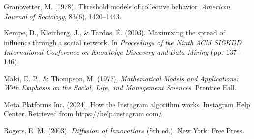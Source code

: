 \documentclass[11pt]{article}
\begin{document}
Granovetter, M. (1978). Threshold models of collective behavior. \textit{American Journal of Sociology}, 83(6), 1420--1443.

Kempe, D., Kleinberg, J., \& Tardos, \'{E}. (2003). Maximizing the spread of influence through a social network. In \textit{Proceedings of the Ninth ACM SIGKDD International Conference on Knowledge Discovery and Data Mining} (pp.~137--146).

Maki, D. P., \& Thompson, M. (1973). \textit{Mathematical Models and Applications: With Emphasis on the Social, Life, and Management Sciences}. Prentice Hall.

Meta Platforms Inc. (2024). How the Instagram algorithm works. Instagram Help Center. Retrieved from \url{https://help.instagram.com/}

Rogers, E. M. (2003). \textit{Diffusion of Innovations} (5th ed.). New York: Free Press.
\end{document}
